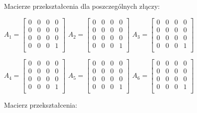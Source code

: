 Macierze przekształcenia dla poszczególnych złączy:

\vspace{5mm}

$A_1 = 
\begin{bmatrix}
0 & 0 & 0 & 0 \\
0 & 0 & 0 & 0 \\
0 & 0 & 0 & 0 \\
0 & 0 & 0 & 1 \\
\end{bmatrix}$
$A_2 = 
\begin{bmatrix}
0 & 0 & 0 & 0 \\
0 & 0 & 0 & 0 \\
0 & 0 & 0 & 0 \\
0 & 0 & 0 & 1 \\
\end{bmatrix}$
$A_3 = 
\begin{bmatrix}
0 & 0 & 0 & 0 \\
0 & 0 & 0 & 0 \\
0 & 0 & 0 & 0 \\
0 & 0 & 0 & 1 \\
\end{bmatrix}$

$A_4 = 
\begin{bmatrix}
0 & 0 & 0 & 0 \\
0 & 0 & 0 & 0 \\
0 & 0 & 0 & 0 \\
0 & 0 & 0 & 1 \\
\end{bmatrix}$
$A_5 = 
\begin{bmatrix}
0 & 0 & 0 & 0 \\
0 & 0 & 0 & 0 \\
0 & 0 & 0 & 0 \\
0 & 0 & 0 & 1 \\
\end{bmatrix}$
$A_6 = 
\begin{bmatrix}
0 & 0 & 0 & 0 \\
0 & 0 & 0 & 0 \\
0 & 0 & 0 & 0 \\
0 & 0 & 0 & 1 \\
\end{bmatrix}$

\vspace{5 mm}

Macierz przekształcenia:

\vspace{5 mm}

